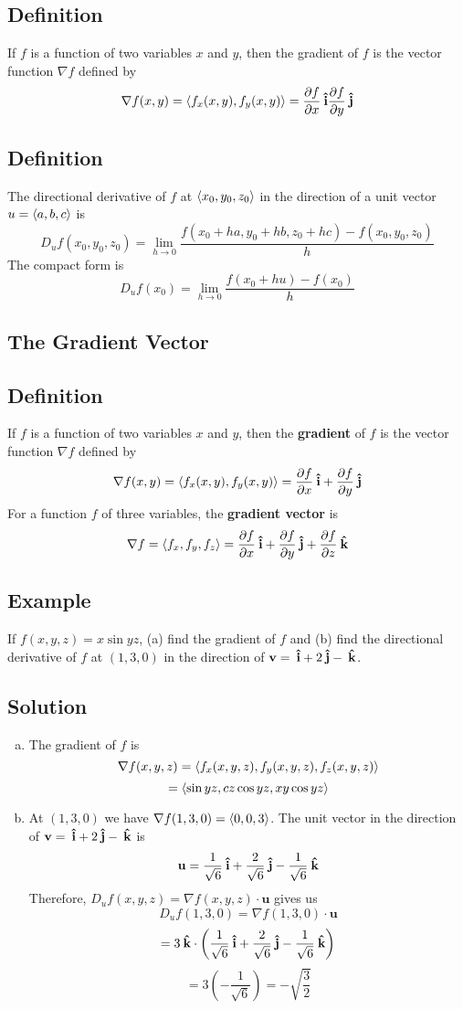 \subsection*{Definition}
If $f$ is a function of two variables $x$ and $y$, then the gradient of $f$ is
the vector function $\nabla f$ defined by
$$\nabla f(x,y)=\ev{f_x(x,y),f_y(x,y)}=\pdv{f}{x}\ihat\pdv{f}{y}\jhat$$

\subsection*{Definition}
The directional derivative of $f$ at $\ev{x_0, y_0, z_0}$ in the direction
of a unit vector $u = \ev{a, b, c}$ is
$$D_uf(x_0, y_0, z_0)=\lim_{h\to 0}\frac{f(x_0+ha,y_0+hb,z_0+hc)-f(x_0,y_0,z_0)}{h}$$
The compact form is
$$D_uf(x_0)=\lim_{h\to 0}\frac{f(x_0+hu)-f(x_0)}{h}$$

\subsection*{The Gradient Vector}

\subsection*{Definition}
If $f$ is a function of two variables $x$ and $y$, then the \textbf{gradient} of $f$
is the vector function $\nabla f$ defined by
$$\nabla f(x,y)=\ev{f_x(x,y),f_y(x,y)}=\pdv{f}{x}\ihat+\pdv{f}{y}\jhat$$
For a function $f$ of three variables, the \textbf{gradient vector} is
$$\nabla f=\ev{f_x,f_y,f_z}=\pdv{f}{x}\ihat+\pdv{f}{y}\jhat+\pdv{f}{z}\khat$$

\subsection*{Example}
If $f(x,y,z)=x\sin{yz}$, (a) find the gradient of $f$ and (b) find the directional
derivative of $f$ at $(1,3,0)$ in the direction of $\textbf{v}=\:\boldsymbol{\hat{\textbf{i}}}+2\:\boldsymbol{\hat{\textbf{j}}}-\:\boldsymbol{\hat{\textbf{k}}}$.

\subsection*{Solution}
\begin{enumerate}[(a)]
    \item The gradient of $f$ is
          $$\nabla f(x,y,z)=\ev{f_x(x,y,z),f_y(x,y,z),f_z(x,y,z)}$$
          $$=\ev{\sin{yz},cz\cos{yz},xy\cos{yz}}$$
    \item At $(1,3,0)$ we have $\nabla f(1,3,0)=\ev{0,0,3}$. The unit vector in the
          direction of $\textbf{v}=\:\boldsymbol{\hat{\textbf{i}}}+2\:\boldsymbol{\hat{\textbf{j}}}-\:\boldsymbol{\hat{\textbf{k}}}$ is
          $$\textbf{u}=\frac{1}{\sqrt{6}}\:\boldsymbol{\hat{\textbf{i}}}+\frac{2}{\sqrt{6}}\:\boldsymbol{\hat{\textbf{j}}}-\frac{1}{\sqrt{6}}\:\boldsymbol{\hat{\textbf{k}}}$$
          Therefore, $D_uf(x,y,z)=\nabla f(x,y,z) \cdot \textbf{u}$ gives us
          $$D_uf(1,3,0)=\nabla f(1,3,0)\cdot\textbf{u}$$
          $$=3\:\boldsymbol{\hat{\textbf{k}}}\cdot\left(\frac{1}{\sqrt{6}}\:\boldsymbol{\hat{\textbf{i}}}+\frac{2}{\sqrt{6}}\:\boldsymbol{\hat{\textbf{j}}}-\frac{1}{\sqrt{6}}\:\boldsymbol{\hat{\textbf{k}}}\right)$$
          $$=3\left(-\frac{1}{\sqrt{6}}\right)=-\sqrt{\frac{3}{2}}$$
\end{enumerate}


